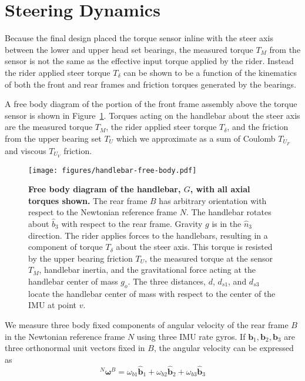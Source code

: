 \documentclass[10pt]{article}
\begin{document}
\section*{Steering Dynamics}
\label{sec:steer-dynamics}


Because the final design placed the torque sensor inline with the steer axis between
the lower and upper head set bearings, the measured torque $T_M$ from the
sensor is not the same as the effective input torque applied by the rider. Instead
the rider applied steer torque $T_\delta$ can be shown to be a function of the
kinematics of both the front and rear frames and friction torques generated
by the bearings.

A free body diagram of the portion of the front frame assembly
above the torque sensor is shown in Figure~\ref{fig:handlebar-free-body}. Torques
acting on the handlebar about the steer axis are the measured torque $T_M$, the
rider applied steer torque $T_\delta$, and the friction from the upper bearing
set $T_U$ which we approximate as a sum of Coulomb $T_{U_F}$ and viscous  $T_{U_V}$
friction.

\begin{figure}
  \centering
  \texttt{[image: figures/handlebar-free-body.pdf]}
  \caption{{\bf Free body diagram of the handlebar, $G$, with all axial torques
    shown.} The rear frame $B$ has arbitrary orientation with respect to the
    Newtonian reference frame $N$. The handlebar rotates about $\hat{b}_3$ with
    respect to the rear frame. Gravity $g$ is in the $\hat{n}_3$ direction. The
    rider applies forces to the handlebars, resulting in a component of torque
    $T_\delta$ about the steer axis. This torque is resisted by the upper
    bearing friction $T_U$, the measured torque at the sensor $T_M$, 
    handlebar inertia, and the gravitational force acting at the
    handlebar center of mass $g_o$. The three distances, $d$, $d_{s1}$, and
    $d_{s3}$ locate the handlebar center of mass with respect to the center of
    the IMU at point $v$.}
  \label{fig:handlebar-free-body}
\end{figure}

We measure three body fixed components of angular velocity of the rear
frame $B$ in the Newtonian reference frame $N$ using three IMU rate gyros.
If $\mathbf{b}_{1},\mathbf{b}_{2},\mathbf{b}_{3}$ are three orthonormal unit
vectors fixed in $B$, the angular velocity can be expressed as
%
\begin{equation}
  ^N\boldsymbol{\omega}^B = \omega_{b1}\hat{\mathbf{b}}_1 +
                            \omega_{b2}\hat{\mathbf{b}}_2 +
                            \omega_{b3}\hat{\mathbf{b}}_3
  \label{eq:rear-frame-angular-rate}
\end{equation}
\end{document}

